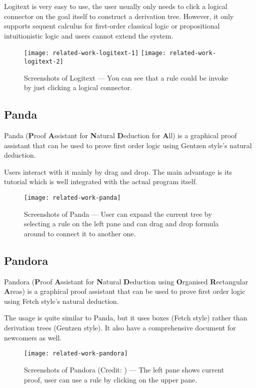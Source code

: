 \documentclass[master.tex]{subfiles}
\begin{document}
Logitext is very easy to use, the user usually only needs to click a logical
connector on the goal itself to construct a derivation tree. However, it only
supports sequent calculus for first-order classical logic or propositional
intuitionistic logic and users cannot extend the system.

\begin{figure}[H]
    \centering
    \texttt{[image: related-work-logitext-1]}
    \texttt{[image: related-work-logitext-2]}
    \caption{Screenshots of Logitext --- You can see that a rule could be invoke
      by just clicking a logical connector.}
\label{fig:related-work-logitext}
\end{figure}

\subsection{Panda}
Panda\supercite{panda-official-website}\supercite{Gasquet2011} (\textbf{P}roof
\textbf{A}ssistant for \textbf{N}atural \textbf{D}eduction for \textbf{A}ll) is
a graphical proof assistant that can be used to prove first order logic using
Gentzen style's natural deduction.

Users interact with it mainly by drag and drop. The main advantage is its
tutorial which is well integrated with the actual program itself.

\begin{figure}[H]
    \centering
    \texttt{[image: related-work-panda]}
    \caption{Screenshots of Panda --- User can expand the current tree by
      selecting a rule on the left pane and can drag and drop formula around to
      connect it to another one.}
\label{fig:related-work-panda}
\end{figure}

\newpage

\subsection{Pandora}
Pandora\supercite{pandora-official-website}\supercite{Broda2007PandoraAR}
(\textbf{P}roof \textbf{A}ssistant for \textbf{N}atural \textbf{D}eduction using
\textbf{O}rganised \textbf{R}ectangular \textbf{A}reas) is a graphical proof
assistant that can be used to prove first order logic using Fetch style's
natural deduction.

The usage is quite similar to Panda, but it uses boxes (Fetch style) rather than
derivation trees (Gentzen style). It also have a comprehensive document for
newcomers as well.

\begin{figure}[H]
    \centering
    \texttt{[image: related-work-pandora]}
    \caption{Screenshots of Pandora (Credit: \cite{Broda2007PandoraAR}) ---
      The left pane shows current proof, user can use a rule by clicking on the
      upper pane.}
\label{fig:related-work-pandora}
\end{figure}
\end{document}
